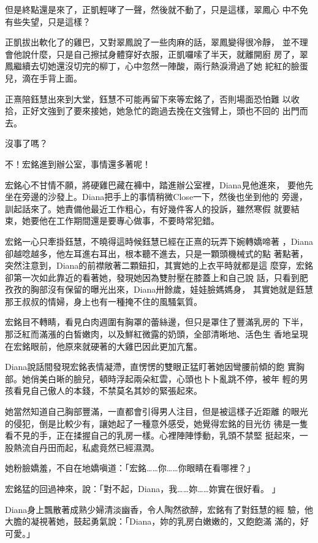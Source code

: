 但是終點還是來了，正凱輕哮了一聲，然後就不動了，只是這樣，翠鳳心
中不免有些失望，只是這樣？

正凱拔出軟化了的雞巴，又對翠鳳說了一些肉麻的話，翠鳳變得很冷靜，
並不理會他說什麼，只是自己擦拭身體穿好衣服，正凱囉嗦了半天，就離開廚
房了，翠鳳繼續去切她還沒切完的柳丁，心中忽然一陣酸，兩行熱淚滑過了她
紽紅的臉蛋兒，滴在手背上面。

正熹陪鈺慧出來到大堂，鈺慧不可能再留下來等宏銘了，否則場面恐怕難
以收拾，正好文強到了要來接她，她急忙的跑過去挽在文強臂上，頭也不回的
出門而去。

沒事了嗎？

不！宏銘進到辦公室，事情還多著呢！

宏銘心不甘情不願，將硬雞巴藏在褲中，踏進辦公室裡，Diana見他進來，
要他先坐在旁邊的沙發上。Diana把手上的事情稍微Close一下，然後也坐到他的
旁邊，訓起話來了。她責備他最近工作粗心，有好幾件客人的投訴，雖然寒假
就要結束，她要他在工作期間還是要專心做事，不要時常犯錯。

宏銘一心只牽掛鈺慧，不曉得這時候鈺慧已經在正熹的玩弄下婉轉嬌啼著
，Diana卻越唸越多，他左耳進右耳出，根本聽不進去，只是一顆頭機械式的點
著點著，突然注意到，Diana的前襟敞著二顆鈕扣，其實她的上衣平時就都是這
麼穿，宏銘卻第一次如此靠近的看著她，發現她因為雙肘壓在膝蓋上和自己說
話，只看到肥孜孜的胸部沒有保留的曝光出來，Diana卅餘歲，娃娃臉媽媽身，
其實她就是鈺慧那王叔叔的情婦，身上也有一種掩不住的風騷氣質。

宏銘目不轉睛，看見白肉週圍有胸罩的蕾絲邊，但只是罩住了豐滿乳房的
下半，那泛紅而滿漲的白皙嫩肉，以及鮮紅微露的奶頭，全部清晰地、活色生
香地呈現在宏銘眼前，他原來就硬著的大雞巴因此更加亢奮。

Diana說話間發現宏銘表情凝滯，直愣愣的雙眼正猛盯著她因彎腰前傾的飽
實胸部。她俏美白晰的臉兒，頓時浮起兩朵紅雲，心頭也卜卜亂跳不停，被年
輕的男孩看見自己傲人的本錢，不禁莫名其妙的緊張起來。

她當然知道自己胸部豐滿，一直都會引得男人注目，但是被這樣子近距離
的眼光的侵犯，倒是比較少有，讓她起了一種意外感受，她覺得宏銘的目光彷
彿是一隻看不見的手，正在揉握自己的乳房一樣。心裡陣陣悸動，乳頭不禁堅
挺起來，一股熱流自丹田而起，私處竟然已經濕潤。

她粉臉嬌羞，不自在地嬌嗔道：「宏銘……你……你眼睛在看哪裡？」

宏銘猛的回過神來，說：「對不起，Diana，我……妳……妳實在很好看。
」

Diana身上飄散著成熟少婦清淡幽香，令人陶然欲醉，宏銘有了對鈺慧的經
驗，他大膽的凝視著她，鼓起勇氣說：「Diana，妳的乳房白嫩嫩的，又飽飽滿
滿的，好可愛。」

